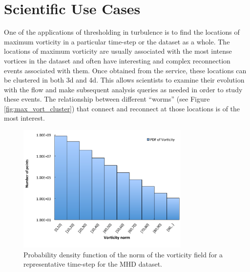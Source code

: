 \documentclass{sig-alternate}
\begin{document}
\section{Scientific Use Cases}\label{science_use_cases}

One of the applications of thresholding in turbulence is to find the locations of maximum vorticity in a particular time-step or the dataset as a whole.
The locations of maximum vorticity are usually associated with the most intense vortices in the dataset and often have interesting and complex
reconnection events associated with them. 
Once obtained from the service, these locations can be clustered in both 3d and 4d. This allows scientists to examine their evolution with the flow
and make subsequent analysis queries as needed in order to study these events. The relationship between different ``worms'' (see Figure \ref{fig:max_vort_cluster}) that connect and reconnect
at those locations is of the most interest.

\begin{figure}
\centering
\includegraphics[width=3.35in]{Figures/pdf.pdf}
\caption{Probability density function of the norm of the vorticity field for a representative time-step for the MHD dataset.}
\label{fig:pdf}
\end{figure}
\end{document}

